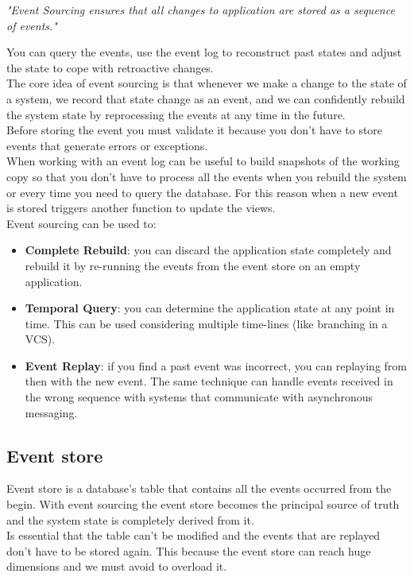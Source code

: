 \newpage
{}
\begin{center}
	\emph{"Event Sourcing ensures that all changes to application are stored as a sequence of events."} \\
\end{center}

You can query the events, use the event log to reconstruct past states and adjust the state to cope with retroactive changes.\\
The core idea of event sourcing is that whenever we make a change to the state of a system, we record that state change as an event, and we can confidently rebuild the system state by reprocessing the events at any time in the future.\\
Before storing the event you must validate it because you don't have to store events that generate errors or exceptions.\\ 
When working with an event log can be useful to build snapshots of the working copy so that you don't have to process all the events when you rebuild the system or every time you need to query the database. For this reason when a new event is stored triggers another function to update the views.\\
Event sourcing can be used to:
\begin{itemize}
	\item \textbf{Complete Rebuild}: you can discard the application state completely and rebuild it by re-running the events from the event store on an empty application.
	\item \textbf{Temporal Query}: you can determine the application state at any point in time. This can be used considering multiple time-lines (like branching in a VCS).
	\item \textbf{Event Replay}: if you find a past event was incorrect, you can replaying from then with the new event. The same technique can handle events received in the wrong sequence with systems that communicate with asynchronous messaging.
	
\end{itemize}

\subsection{Event store}
Event store is a database's table that contains all the events occurred from the begin.
With event sourcing the event store becomes the principal source of truth and the system state is completely derived from it. \\
Is essential that the table can't be modified and the events that are replayed don't have to be stored again. 
This because the event store can reach huge dimensions and we must avoid to overload it.

